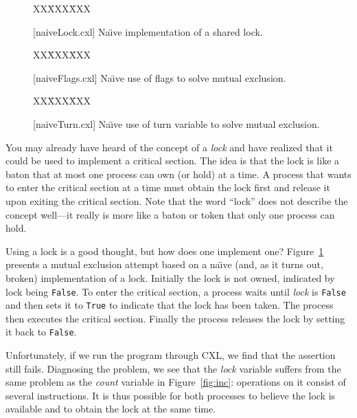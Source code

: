 \documentclass{report}
\newcommand{\cxlsource}[1]{
\begin{tabbing}
XX\=XXX\=XXX\kill
    
\end{tabbing}
}
\newenvironment{code}{
\tcolorbox
}{
\endtcolorbox
}
\begin{document}
\begin{figure}
\begin{code}
\cxlsource{naiveLock}
\end{code}
\caption{[naiveLock.cxl] Na\"{\i}ve implementation of a shared lock.}
\label{fig:uplock}
\end{figure}

\begin{figure}
\begin{code}
\cxlsource{naiveFlags}
\end{code}
\caption{[naiveFlags.cxl] Na\"{\i}ve use of flags to solve mutual exclusion.}
\label{fig:upflags}
\end{figure}

\begin{figure}
\begin{code}
\cxlsource{naiveTurn}
\end{code}
\caption{[naiveTurn.cxl] Na\"{\i}ve use of turn variable to solve mutual exclusion.}
\label{fig:upturn}
\end{figure}


You may already have heard of the concept of a \emph{lock}
and have realized that
it could be used to implement a critical section.
The idea is that the lock is like a baton that at most one process can own
(or hold) at a time.
A process that wants to enter the critical section at a time must obtain the
lock first and release it upon exiting the critical section.
Note that the word ``lock'' does not describe the concept well---it really
is more like a baton or token that only one process can hold.

Using a lock is a good thought, but how does one implement one?
Figure~\ref{fig:uplock} presents a mutual exclusion attempt based on a
na\"{\i}ve (and, as it turns out, broken) implementation of a lock.
Initially the lock is not owned, indicated by lock being \texttt{False}.
To enter the critical section, a process waits until \textit{lock} is \texttt{False}
and then sets it to \texttt{True} to indicate that the lock has been taken.
The process then executes the critical section.  Finally the process
releases the lock by setting it back to \texttt{False}.

Unfortunately, if we run the program through CXL, we find that the assertion still
fails.  Diagnosing the problem, we see that the \textit{lock} variable
suffers from the same problem as the \textit{count} variable
in Figure~\ref{fig:inc}: operations
on it consist of several instructions.  It is thus possible
for both processes to believe the lock is available and to obtain the lock
at the same time.
\end{document}
